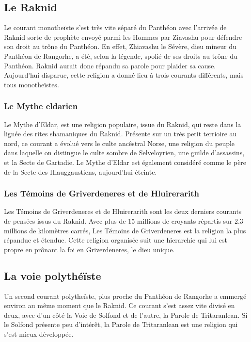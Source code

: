 \documentclass[french, a4paper, 12pt]{article}
\begin{document}
	\subsection{Le Raknid}

		Le courant monotheïste s'est très vite séparé du Panthéon avec l'arrivée de Raknid sorte de prophète envoyé parmi les Hommes par Ziavashu pour défendre son droit au trône du Panthéon. En effet, Zhiavashu le Sévère, dieu mineur du Panthéon de Rangorhe, a été, selon la légende, spolié de ses droits au trône du Panthéon. Raknid aurait donc répandu sa parole pour plaider sa cause. Aujourd'hui disparue, cette religion a donné lieu à trois courants différents, mais tous monotheïstes.

		\subsubsection{Le Mythe eldarien}

		Le Mythe d'Eldar, est une religion populaire, issue du Raknid, qui reste dans la lignée des rites shamaniques du Raknid. Présente sur un très petit terrioire au nord, ce courant a évolué vers le culte ancêstral Norse, une religion du peuple dans laquelle on distingue le culte sombre de Selveloyrien, une guilde d'assassins, et la Secte de Gartadie. Le Mythe d'Eldar est également considéré comme le père de la Secte des Hlauggaustiens, aujourd'hui éteinte.

		\subsubsection{Les Témoins de Griverdeneres et de Hluirerarith}

		Les Témoins de Griverdeneres et de Hluirerarith sont les deux derniers courants de pensées issus du Raknid. Avec plus de 15 millions de croyants répartis sur 2.3 millions de kilomètres carrés, Les Témoins de Griverdeneres est la religion la plus répandue et étendue. Cette religion organisée suit une hierarchie qui lui est propre en prônant la foi en Griverdeneres, le dieu unique.

	\subsection{La voie polythéïste}

	Un second courant polytheïste, plus proche du Panthéon de Rangorhe a emmergé environ au même moment que le Raknid. Ce courant s'est assez vite divisé en deux, avec d'un côté la Voie de Solfond et de l'autre, la Parole de Tritaranlean. Si le Solfond présente peu d'intérêt, la Parole de Tritaranlean est une religion qui s'est mieux développée.
\end{document}
